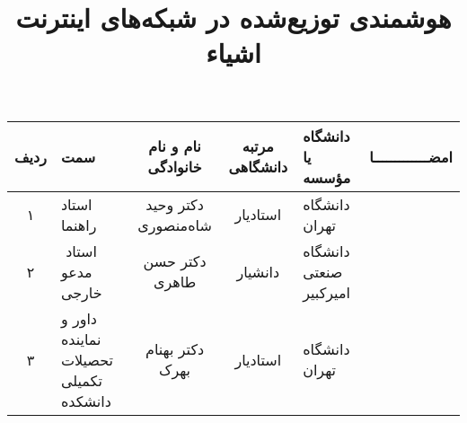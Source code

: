 \subject{مهندسی برق}

\title{هوشمندی توزیع‌شده در شبکه‌های اینترنت اشیاء}

\firstPage

\cleartorightpage
\besmPage

\cleartorightpage
\firstPage

\cleartorightpage


%
  


 \davaranPage
\vspace{.5cm}
\renewcommand{\arraystretch}{1.2}
 \begin{center}
   \begin{tabular}{|c|p{30mm}|c|c|p{25mm}|c|}
     \hline
     ردیف	  & سمت                                           & نام و نام خانوادگی    & مرتبه \newline دانشگاهی &	دانشگاه یا مؤسسه               & امضـــــــــــــا \\
     \hline
     ۱       & استاد راهنما                                  & دکتر وحید شاه‌منصوری   & استاد‌یار                & دانشگاه تهران                   &                   \\
     \hline
     ۲       &‌ استاد مدعو خارجی                              & دکتر حسن طاهری  & دانشیار                 & دانشگاه \newline صنعتی امیرکبیر &                    \\
     \hline
     ۳       & داور و نماینده \newline تحصیلات تکمیلی دانشکده & دکتر بهنام بهرک      & استادیار                   & دانشگاه تهران                   &                    \\
     \hline
   \end{tabular}
 \end{center}

